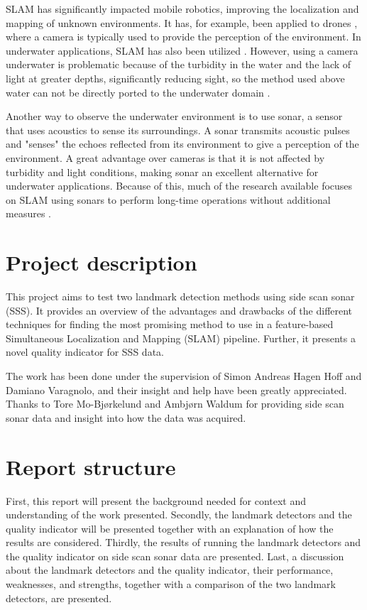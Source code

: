 SLAM has significantly impacted mobile robotics, improving the localization and mapping of unknown environments. It has, for example, been applied to drones \cite{VonStumberg2017FromExploration}, where a camera is typically used to provide the perception of the environment. In underwater applications, SLAM has also been utilized \cite{Hidalgo2015ReviewTechniques}. However, using a camera underwater is problematic because of the turbidity in the water and the lack of light at greater depths, significantly reducing sight, so the method used above water can not be directly ported to the underwater domain \cite{Paull2015Communication-constrainedSLAM}.  

Another way to observe the underwater environment is to use sonar, a sensor that uses acoustics to sense its surroundings. A sonar transmits acoustic pulses and "senses" the echoes reflected from its environment to give a perception of the environment. A great advantage over cameras is that it is not affected by turbidity and light conditions, making sonar an excellent alternative for underwater applications. Because of this, much of the research available focuses on SLAM using sonars to perform long-time operations without additional measures \cite{Hidalgo2015ReviewTechniques}.

\section{Project description}

This project aims to test two landmark detection methods using side scan sonar (SSS). It provides an overview of the advantages and drawbacks of the different techniques for finding the most promising method to use in a feature-based Simultaneous Localization and Mapping (SLAM) pipeline. Further, it presents a novel quality indicator for SSS data.

The work has been done under the supervision of Simon Andreas Hagen Hoff and Damiano Varagnolo, and their insight and help have been greatly appreciated. Thanks to Tore Mo-Bjørkelund and Ambjørn Waldum for providing side scan sonar data and insight into how the data was acquired. 

\section{Report structure}

First, this report will present the background needed for context and understanding of the work presented. Secondly, the landmark detectors and the quality indicator will be presented together with an explanation of how the results are considered. Thirdly, the results of running the landmark detectors and the quality indicator on side scan sonar data are presented. Last, a discussion about the landmark detectors and the quality indicator, their performance, weaknesses, and strengths, together with a comparison of the two landmark detectors, are presented. 


